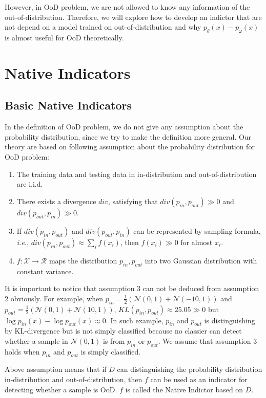 \documentclass[letterpaper]{article} %
\newcommand{\IE}{\textit{i.e.}, }
\newcommand{\pin}{p_{in}}
\newcommand{\pout}{p_{out}}
\begin{document}
However, in OoD problem, we are not allowed to know any information of the out-of-distribution. 
Therefore, we will explore how to develop an indictor that are not depend on a model trained on out-of-distribution and why $p_\theta(x) - p_\omega(x)$ is almost useful for OoD theoretically. 

\section{Native Indicators}
\subsection{Basic Native Indicators}
In the definition of OoD problem, we do not give any assumption about the probability distribution, since we try to make the definition more general. Our theory are based on following assumption about the probability distribution for OoD problem:
\begin{enumerate}
	\item The training data and testing data in in-distribution and out-of-distribution are i.i.d. 
	\item There exists a divergence $div$, satisfying that $div(\pin, \pout) \gg 0$ and $div(\pout, \pin) \gg 0$. 
	\item If $div(\pin, \pout)$ and $div(\pout, \pin)$ can be represented by sampling formula, \IE $div(\pin, \pout) \approx \sum_{i} f(x_i)$, then $f(x_i) \gg 0$ for almost  $x_i$. 
	\item $f: \mathcal{X} \rightarrow \mathcal{R}$ maps the distribution $\pin, \pout$ into two Gaussian distribution with constant variance. 
\end{enumerate} 

It is important to notice that assumption 3 can not be deduced from assumption 2 obviously. For example, when $\pin = \frac{1}{2}(\mathcal{N}(0, 1) + \mathcal{N}(-10, 1))$ and $\pout = \frac{1}{2}(\mathcal{N}(0, 1) + \mathcal{N}(10, 1))$, $KL(\pin, \pout) \approx 25.05 \gg 0$ but $\log \pin(x) - \log \pout(x) \approx 0$.  In such example, $\pin$ and $\pout$ is distinguishing by KL-divergence but is not simply classified because no classier can detect whether a sample in $\mathcal{N}(0, 1)$ is from $\pin$ or $\pout$. We assume that assumption 3 holds when $\pin$ and $\pout$ is simply classified. 

Above assumption means that if $D$ can distinguishing the probability distribution                                                                                                        in-distribution and out-of-distribution, then $f$ can be used as an indicator for detecting whether a sample is OoD. $f$ is called the Native Indictor based on $D$. 
\end{document}

